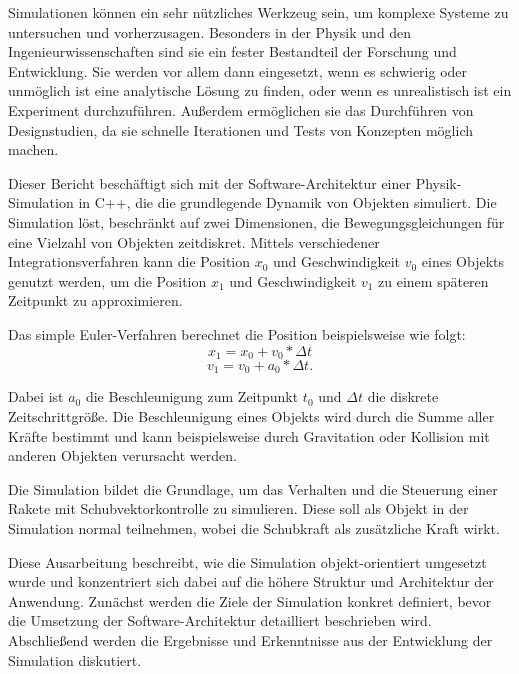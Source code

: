 \documentclass[10pt,twocolumn]{extarticle}
\begin{document}
Simulationen können ein sehr nützliches Werkzeug sein, um komplexe Systeme zu untersuchen und vorherzusagen. Besonders in der Physik und den Ingenieurwissenschaften sind sie ein fester Bestandteil der Forschung und Entwicklung. Sie werden vor allem dann eingesetzt, wenn es schwierig oder unmöglich ist eine analytische Lösung zu finden, oder wenn es unrealistisch ist ein Experiment durchzuführen. Außerdem ermöglichen sie das Durchführen von Designstudien, da sie schnelle Iterationen und Tests von Konzepten möglich machen.

Dieser Bericht beschäftigt sich mit der Software-Architektur einer Physik-Simulation in C++, die die grundlegende Dynamik von Objekten simuliert. Die Simulation löst, beschränkt auf zwei Dimensionen, die Bewegungsgleichungen für eine Vielzahl von Objekten zeitdiskret. Mittels verschiedener Integrationsverfahren kann die Position $x_0$ und Geschwindigkeit $v_0$ eines Objekts genutzt werden, um die Position $x_1$ und Geschwindigkeit $v_1$ zu einem späteren Zeitpunkt zu approximieren.

Das simple Euler-Verfahren berechnet die Position beispielsweise wie folgt:
\begin{equation}
x_1 = x_0 + v_0 * \Delta t
\end{equation}
\begin{equation}
v_1 = v_0 + a_0 * \Delta t.
\end{equation}

Dabei ist $a_0$ die Beschleunigung zum Zeitpunkt $t_0$ und $\Delta t$ die diskrete Zeitschrittgröße. Die Beschleunigung eines Objekts wird durch die Summe aller Kräfte bestimmt und kann beispielsweise durch Gravitation oder Kollision mit anderen Objekten verursacht werden.

Die Simulation bildet die Grundlage, um das Verhalten und die Steuerung einer Rakete mit Schubvektorkontrolle zu simulieren. Diese soll als Objekt in der Simulation normal teilnehmen, wobei die Schubkraft als zusätzliche Kraft wirkt.

Diese Ausarbeitung beschreibt, wie die Simulation objekt-orientiert umgesetzt wurde und konzentriert sich dabei auf die höhere Struktur und Architektur der Anwendung. Zunächst werden die Ziele der Simulation konkret definiert, bevor die Umsetzung der Software-Architektur detailliert beschrieben wird. Abschließend werden die Ergebnisse und Erkenntnisse aus der Entwicklung der Simulation diskutiert.

\end{document}
